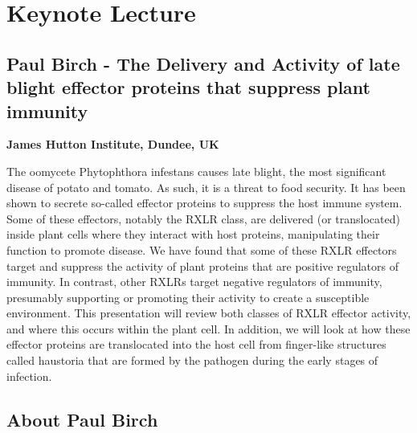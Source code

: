 \documentclass[12pt,]{book}
\theoremstyle{definition}
\theoremstyle{definition}
\theoremstyle{remark}
\begin{document}
\newpage

\section*{Keynote Lecture}\label{keynote-lecture-4}

\subsection*{Paul Birch - The Delivery and Activity of late blight
effector proteins that suppress plant
immunity}\label{paul-birch---the-delivery-and-activity-of-late-blight-effector-proteins-that-suppress-plant-immunity}

\textbf{James Hutton Institute, Dundee, UK}

The oomycete Phytophthora infestans causes late blight, the most
significant disease of potato and tomato. As such, it is a threat to
food security. It has been shown to secrete so-called effector proteins
to suppress the host immune system. Some of these effectors, notably the
RXLR class, are delivered (or translocated) inside plant cells where
they interact with host proteins, manipulating their function to promote
disease. We have found that some of these RXLR effectors target and
suppress the activity of plant proteins that are positive regulators of
immunity. In contrast, other RXLRs target negative regulators of
immunity, presumably supporting or promoting their activity to create a
susceptible environment. This presentation will review both classes of
RXLR effector activity, and where this occurs within the plant cell. In
addition, we will look at how these effector proteins are translocated
into the host cell from finger-like structures called haustoria that are
formed by the pathogen during the early stages of infection.

\subsection*{About Paul Birch}\label{about-paul-birch}
\end{document}

